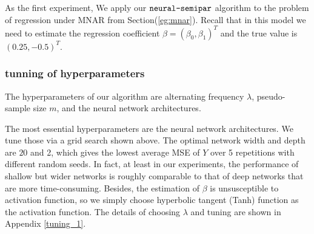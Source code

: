 \documentclass[11pt]{article}
\def\neurosemi{{\normalfont\texttt{neural-semipar}}}
\begin{document}

As the first experiment, We apply our $\neurosemi$ algorithm to the problem of  regression under MNAR from Section(\ref{eg:mnar}). Recall that in this model we need to estimate the regression coefficient $\beta = (\beta_{0}, \beta_{1})^{T}$ and the true value is $(0.25, -0.5)^{T}$. 

\subsubsection{tunning of hyperparameters}

The hyperparameters of our algorithm are alternating frequency $\lambda$, pseudo-sample size $m$, and the neural network architectures.

The most essential hyperparameters are the neural network architectures. We tune those via a grid search shown above. The optimal network width and depth are $20$ and 2, which gives the lowest average MSE of $Y$ over 5 repetitions with different random seeds. In fact, at least in our experiments, the performance of shallow but wider networks is roughly comparable to that of deep networks that are more time-consuming. Besides, the estimation of $\beta$ is unsusceptible to activation function, so we simply choose hyperbolic tangent (Tanh) function
as the activation function. The details of choosing $\lambda$ and tuning are shown in Appendix \ref{tuning_1}.
\end{document}
